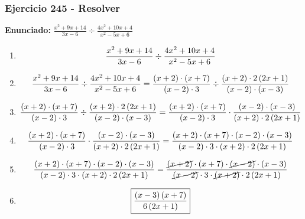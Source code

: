 \documentclass[11pt,a4paper]{article}
\newcommand{\fitmath}[1]{%
\[
\setbox0=\hbox{$\displaystyle #1$}%
\ifdim\wd0>\linewidth
\resizebox{\linewidth}{!}{$\displaystyle #1$}%
\else
#1%
\fi
\]
}
\begin{document}
\subsubsection*{Ejercicio 245 - Resolver}
\textbf{Enunciado:} $ \frac{x^{2} + 9 x + 14}{3 x - 6} \div \frac{4 x^{2} + 10 x + 4}{x^{2} - 5 x + 6} $\par
\begin{enumerate}[leftmargin=2em]
\item \fitmath{\frac{x^{2} + 9 x + 14}{3 x - 6} \div \frac{4 x^{2} + 10 x + 4}{x^{2} - 5 x + 6}}
\item \fitmath{\frac{x^{2} + 9 x + 14}{3 x - 6} \div \frac{4 x^{2} + 10 x + 4}{x^{2} - 5 x + 6}= \frac{\left(x + 2\right)\cdot \left(x + 7\right)}{\left(x - 2\right)\cdot 3} \div \frac{\left(x + 2\right)\cdot 2 \left(2 x + 1\right)}{\left(x - 2\right)\cdot \left(x - 3\right)}}
\item \fitmath{\frac{\left(x + 2\right)\cdot \left(x + 7\right)}{\left(x - 2\right)\cdot 3}\div \frac{\left(x + 2\right)\cdot 2 \left(2 x + 1\right)}{\left(x - 2\right)\cdot \left(x - 3\right)}= \frac{\left(x + 2\right)\cdot \left(x + 7\right)}{\left(x - 2\right)\cdot 3}\cdot \frac{\left(x - 2\right)\cdot \left(x - 3\right)}{\left(x + 2\right)\cdot 2 \left(2 x + 1\right)}}
\item \fitmath{\frac{\left(x + 2\right)\cdot \left(x + 7\right)}{\left(x - 2\right)\cdot 3}\cdot \frac{\left(x - 2\right)\cdot \left(x - 3\right)}{\left(x + 2\right)\cdot 2 \left(2 x + 1\right)}= \frac{\left(x + 2\right)\cdot \left(x + 7\right)\cdot \left(x - 2\right)\cdot \left(x - 3\right)}{\left(x - 2\right)\cdot 3\cdot \left(x + 2\right)\cdot 2 \left(2 x + 1\right)}}
\item \fitmath{\frac{\left(x + 2\right)\cdot \left(x + 7\right)\cdot \left(x - 2\right)\cdot \left(x - 3\right)}{\left(x - 2\right)\cdot 3\cdot \left(x + 2\right)\cdot 2 \left(2 x + 1\right)}= \frac{\cancel{\left(x + 2\right)}\cdot \left(x + 7\right)\cdot \cancel{\left(x - 2\right)}\cdot \left(x - 3\right)}{\cancel{\left(x - 2\right)}\cdot 3\cdot \cancel{\left(x + 2\right)}\cdot 2 \left(2 x + 1\right)}}
\item \fitmath{\boxed{\frac{\left(x - 3\right) \left(x + 7\right)}{6 \left(2 x + 1\right)}}}
\end{enumerate}

\vspace{0.12cm}
\end{document}
